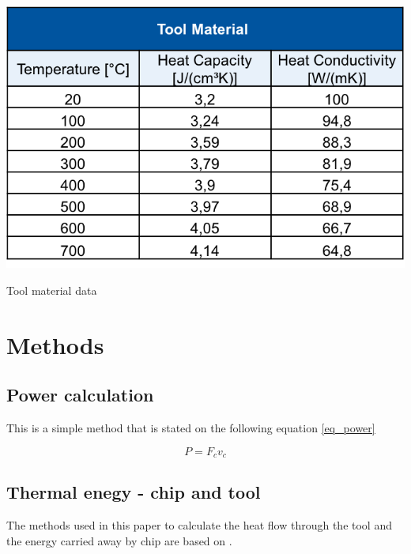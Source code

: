 	\begin{table}[h]
		\centering
		\captionsetup{justification=centering}
		\includegraphics[scale = 0.6]{Imagens/dataTool.png}
		\caption{Tool material data \cite{augspurger2016experimental}}
		\label{tab:dataT}
	\end{table}

	\section{Methods}
	\label{methods}
	
	\subsection{Power calculation}
	This is a simple method that is stated on the following equation \ref{eq_power}

	\begin{equation} 
	\label{eq_power}
		P = F_{c}v_{c}
	\end{equation}
	
	\subsection{Thermal enegy - chip and tool}
	The methods used in this paper to calculate the heat flow through the tool and the energy carried away by chip are based on \cite{boothroyd1963temperatures}.

